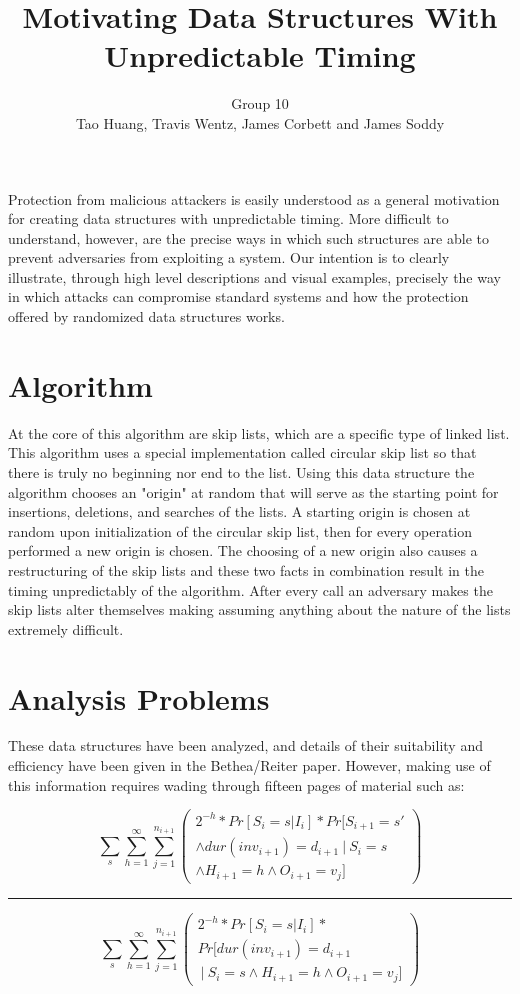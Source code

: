 \documentclass[11pt,twocolumn]{article}
\title{Motivating Data Structures With Unpredictable Timing}
\author{Group 10\\
\small{Tao Huang, Travis Wentz, James Corbett and James Soddy}}
\begin{document}
\maketitle

Protection from malicious attackers is easily understood as a general motivation
for creating data structures with unpredictable timing. More difficult to understand,
however, are the precise ways in which such structures are able to prevent adversaries
from exploiting a system. Our intention is to clearly illustrate, through
high level descriptions and visual examples, precisely the way in which attacks
can compromise standard systems and how the protection offered by randomized
data structures works.

\section{Algorithm}
 At the core of this algorithm are skip lists, which are a specific type of linked list. This algorithm uses a special implementation called circular skip list so that there is truly no beginning nor end to the list. Using this data structure the algorithm chooses an "origin" at random that will serve as the starting point for insertions, deletions, and searches of the lists. A starting origin is chosen at random upon initialization of the circular skip list, then for every operation performed a new origin is chosen. The choosing of a new origin also causes a restructuring of the skip lists and these two facts in combination result in the timing unpredictably of the algorithm. After every call an adversary makes the skip lists alter themselves making assuming anything about the nature of the lists extremely difficult. 
\section{Analysis Problems}
These data structures have been analyzed, and details of their suitability and
efficiency have been given in the Bethea/Reiter paper\cite{Bethea09}. However,
making use of this information requires wading through fifteen pages of material such as:

\begin{minipage}{.5\textwidth}

$$\sum_s\sum_{h=1}^\infty\sum_{j=1}^{n_{i+1}} \left( \begin{matrix}
2^{-h}*Pr[S_i=s | I_i]*Pr[S_{i+1}=s' \\ \land dur(inv_{i+1})=d_{i+1}\  
|\  S_i=s \\ \land H_{i+1}=h \land O_{i+1}=v_j] \end{matrix} \right)$$
\hrule
$$\sum_s\sum_{h=1}^\infty\sum_{j=1}^{n_{i+1}} 
\left( \begin{matrix}2^{-h}*Pr[S_i=s | I_i]*
\\Pr[ dur(inv_{i+1})=d_{i+1} \\ \  | \  S_i=s \land H_{i+1}=h \land O_{i+1}=v_j] \end{matrix} \right)$$

\end{minipage}
\end{document}
